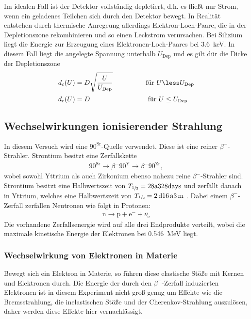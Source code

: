 Im idealen Fall ist der Detektor vollständig depletiert, d.h. es fließt nur Strom,
wenn ein geladenes Teilchen sich durch den Detektor bewegt. In Realität entstehen
durch thermische Anregeung allerdings Elektron-Loch-Paare, die in der Depletionszone
rekombinieren und so einen Leckstrom verursachen. Bei Silizium liegt die Energie
zur Erzeugung eines Elektronen-Loch-Paares bei \SI{3.6}{\kilo\electronvolt}.
In diesem Fall liegt die angelegte Spannung unterhalb $U_\text{Dep}$ und es gilt
dür die Dicke der Depletionszone
\begin{align}
  d_\text{c}(U) &= D\sqrt{\frac{U}{U_\text{Dep}}} \hspace{1.7cm}\text{für } U \less U_\text{Dep} \\
  d_\text{c}(U) &= D \hspace{3cm}\text{für } U \le U_\text{Dep}
\end{align}


\subsection{Wechselwirkungen ionisierender Strahlung}
In diesem Versuch wird eine ${90}^\text{Sr}$-Quelle verwendet. Diese ist eine reiner
$\beta^{-}$-Strahler. Strontium besitzt eine Zerfallskette
\begin{align}
  {90}^\text{Sr} \rightarrow{\beta^{-}} {90}^\text{Y} \rightarrow{\beta^{-}} {90}^\text{Zr},
\end{align}
wobei sowohl Yttrium als auch Zirkonium ebenso nahezu reine $\beta^{-}$-Strahler
sind. Strontium besitzt eine Halbwertszeit von $T_{\sfrac{1}{2}} = \num{28}\text{a}\num{328}\text{days}$
und zerfällt danach in Yttrium, welches eine Halbwertszeit von
$T_{\sfrac{1}{2}} = \num{2}\,\text{d}\num{16}\,\text{a}\num{3}\,\text{m}$ .
Dabei einem $\beta^{-}$-Zerfall zerfallen Neutronen wie folgt in Protonen:
\begin{align}
  \text{n} \rightarrow \text{p} + \text{e}^{-} + \overline{\nu_\text{e}}
\end{align}
Die vorhandene Zerfallsenergie wird auf alle drei Endprodukte verteilt, wobei die maximale
kinetische Energie der Elektronen bei \SI{0.546}{\mega\electronvolt} liegt.

\subsubsection{Wechselwirkung von Elektronen in Materie}
Bewegt sich ein Elektron in Materie, so führen diese elastische Stöße mit Kernen und
Elektronen durch. Die Energie der durch den $\beta^{-}$-Zerfall induzierten Elektronen
ist in diesem Experiment nicht groß genug um Effekte wie die Bremsstrahlung, die
inelastischen Stöße und der Cherenkov-Strahlung auszulösen, daher werden
diese Effekte hier vernachlässigt.

